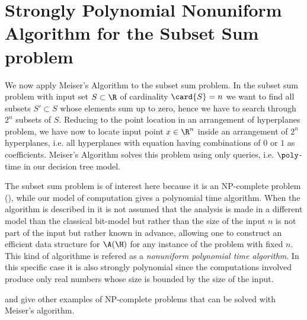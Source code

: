 \section{Strongly Polynomial Nonuniform Algorithm for the Subset Sum problem}

We now apply Meiser's Algorithm to the subset sum problem. In the subset sum
problem with input set $S \subset \R$ of cardinality $\card{S} = n$ we want to
find all subsets $S' \subset S$ whose elements sum up to zero, hence we have
to search through $2^n$ subsets of $S$. Reducing to the point location in an
arrangement of hyperplanes problem, we have now to locate input point $x \in
\R^n$ inside an arrangement of $2^n$ hyperplanes, i.e. all hyperplanes with
equation having combinations of $0$ or $1$ as coefficients. Meiser's Algorithm
solves this problem using only  queries, i.e. $\poly$-time
in our decision tree model.

The subset sum problem is of interest here because it is an NP-complete problem
(\cite{karp:1972}), while our model of computation gives a polynomial time
algorithm. When the algorithm is described in \cite{burgisser:1997} it is not
assumed that the analysis is made in a different model than the classical
bit-model but rather than the size of the input $n$ is not part of the input
but rather known in advance, allowing one to construct an efficient data
structure for $\A(\H)$ for any instance of the problem with fixed $n$. This
kind of algorithme is refered as a \emph{nonuniform polynomial time algorithm}.
In this specific case it is also strongly polynomial since the computations
involved produce only real numbers whose size is bounded by the size of the
input.

\cite{burgisser:1997} and \cite{meiser:1993} give other examples of
NP-complete problems that can be solved with Meiser's algorithm.
